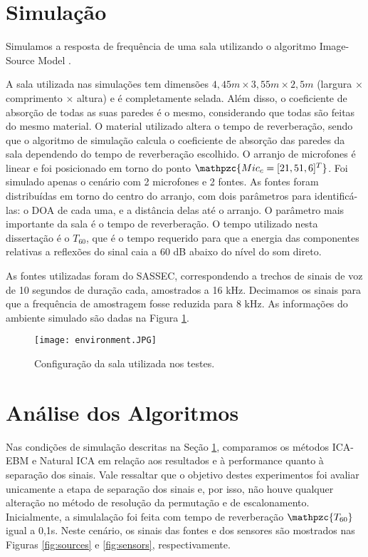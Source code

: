 \label{chap:4}
\section{Simulação}\label{sec:simulation}

Simulamos a resposta de frequência de uma sala utilizando o algoritmo Image-Source Model \cite{simulation}.

A sala utilizada nas simulações tem dimensões $4,45m \times 3,55m \times 2,5m$ (largura × comprimento × altura) e é completamente selada. Além disso, o coeficiente de absorção de todas as suas paredes é o mesmo, considerando que todas são feitas do mesmo material. O material utilizado altera o tempo de reverberação, sendo que o algoritmo de simulação calcula o coeficiente de absorção das paredes da sala dependendo do tempo de reverberação escolhido. O arranjo de microfones é linear e foi posicionado em torno do ponto $\mathpzc{Mic_c = [2 1,5 1,6]^T}$. Foi simulado apenas o cenário com 2 microfones e 2 fontes. As fontes foram distribuídas em torno do centro do arranjo, com dois parâmetros para identificá-las: o DOA de cada uma, e a distância delas até o arranjo. O parâmetro mais importante da sala é o tempo de reverberação. O tempo utilizado nesta dissertação é o ${T_{60}}$, que é o tempo requerido para que a energia das componentes relativas a reflexões do sinal caia a 60 dB abaixo do nível do som direto.

As fontes utilizadas foram do SASSEC, correspondendo a trechos de sinais de voz de 10 segundos de duração cada, amostrados a 16 kHz. Decimamos os sinais para que a frequência de amostragem fosse reduzida para 8 kHz. As informações do ambiente simulado são dadas na Figura \ref{fig:environment}.

\begin{figure}
    \centering
    \texttt{[image: environment.JPG]}
    \caption{Configuração da sala utilizada nos testes.}
    \label{fig:environment}
\end{figure}


 \section{Análise dos Algoritmos}\label{sec:analysis}
    
    Nas condições de simulação descritas na Seção \ref{sec:simulation}, comparamos os métodos ICA-EBM e Natural ICA em relação aos resultados e à performance quanto à separação dos sinais. Vale ressaltar que o objetivo destes experimentos foi avaliar unicamente a etapa de separação dos sinais e, por isso, não houve qualquer alteração no método de resolução da permutação e de escalonamento.  Inicialmente, a simulalação foi feita com tempo de reverberação $\mathpzc{T_{60}}$ igual a 0,1s. Neste cenário, os sinais das fontes e dos sensores são mostrados nas Figuras \ref{fig:sources} e \ref{fig:sensors}, respectivamente.
    

